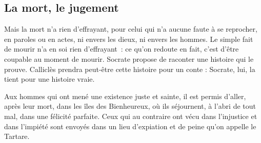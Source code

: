 \subsection*{La mort, le jugement}

Mais la mort n'a rien d'effrayant, pour celui qui n'a aucune faute à se reprocher, en paroles ou en actes, ni envers les dieux, ni envers les hommes. Le simple fait de mourir n'a en soi rien d'effrayant~: ce qu'on redoute en fait, c'est d'être coupable au moment de mourir. Socrate propose de raconter une histoire qui le prouve. Calliclès prendra peut-être cette histoire pour un conte : Socrate, lui, la tient pour une histoire vraie.

Aux hommes qui ont mené une existence juste et sainte, il est permis d'aller, après leur mort, dans les îles des Bienheureux, où ils séjournent, à l'abri de tout mal, dans une félicité parfaite. Ceux qui au contraire ont vécu dans l'injustice et dans l'impiété sont envoyés dans un lieu d'expiation et de peine qu'on appelle le Tartare.%



